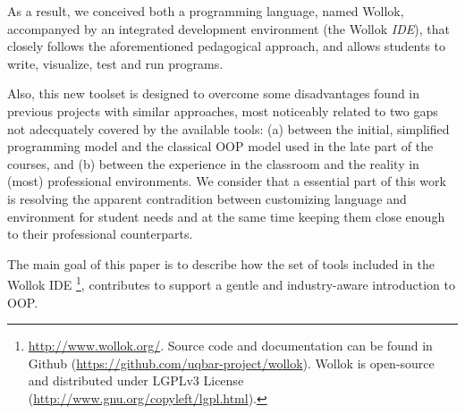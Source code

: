 As a result, we conceived both a programming language, named Wollok,
accompanyed by an integrated development environment (the Wollok \emph{IDE}),
that closely follows the aforementioned pedagogical approach,
and allows students to write, visualize, test and run programs.

Also, this new toolset is designed to overcome some disadvantages 
found in previous projects with similar approaches,
most noticeably related to two gaps not adecquately covered by the available tools:
(a) between the initial, simplified programming model and the classical OOP model
used in the late part of the courses, and
(b) between the experience in the classroom and the reality in (most) professional environments.
We consider that a essential part of this work is resolving the apparent contradition
between customizing language and environment for student needs
and at the same time keeping them close enough to their professional counterparts.


The main goal of this paper is to describe how the set of tools included in the Wollok IDE%
\footnote{
	\url{http://www.wollok.org/}. 
	Source code and documentation can be found in Github 
	(\url{https://github.com/uqbar-project/wollok}).
	Wollok is open-source and distributed under LGPLv3 License 
	(\url{http://www.gnu.org/copyleft/lgpl.html}).}, 
contributes to support a gentle and industry-aware introduction to OOP.


